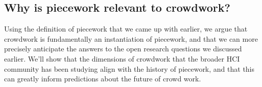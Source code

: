 \documentclass[trackingWork]{subfiles}
\begin{document}


\subsection{Why is piecework relevant to crowdwork?}
Using the definition of piecework that we came up with earlier, we argue that
crowdwork is fundamentally an instantiation of piecework, and
that we can more precisely anticipate the answers to the open research questions we discussed earlier.
We'll show that the dimensions of crowdwork that the broader HCI community has been studying
align with the history of piecework, and that this can greatly inform predictions about the future of crowd work.


\onlyinsubfile{
  \printbibliography
  }
\end{document}
